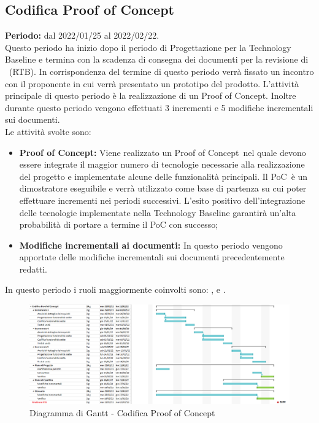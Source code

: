 
\subsection{Codifica Proof of Concept\glo} \label{subsection:pianificazione_PoC}
\textbf{Periodo:} dal 2022/01/25 al 2022/02/22.
\bigskip
\\Questo periodo ha inizio dopo il periodo di Progettazione per la Technology Baseline e termina con la scadenza di consegna dei documenti per la revisione di \RTB\ (RTB\glo).
In corrispondenza del termine di questo periodo verrà fissato un incontro con il proponente in cui verrà presentato un prototipo del prodotto.
L'attività principale di questo periodo è la realizzazione di un Proof of Concept\glo.
Inoltre durante questo periodo vengono effettuati 3 incrementi e 5 modifiche incrementali sui documenti.
\\Le attività svolte sono:
\begin{itemize}
  \item \textbf{Proof of Concept:} Viene realizzato un Proof of Concept\glo\ nel quale devono essere integrate il maggior numero di tecnologie necessarie alla realizzazione del progetto e implementate alcune delle funzionalità principali.
  Il PoC\glo\ è un dimostratore eseguibile e verrà utilizzato come base di partenza su cui poter effettuare incrementi nei periodi successivi.
  L'esito positivo dell'integrazione delle tecnologie implementate nella Technology Baseline garantirà un'alta probabilità di portare a termine il PoC con successo;
  \item \textbf{Modifiche incrementali ai documenti:} In questo periodo vengono apportate delle modifiche incrementali sui documenti precedentemente redatti.
\end{itemize}
In questo periodo i ruoli maggiormente coinvolti sono: \roleDesignerLow{}, \roleProgrammerLow{} e \roleVerifierLow{}.
\bigskip
\begin{figure}[H]
  \centering
   \includegraphics[scale=0.46]{immagini/poc.png}
   \caption{Diagramma di Gantt - Codifica Proof of Concept\glo}
 \end{figure}
 \pagebreak

